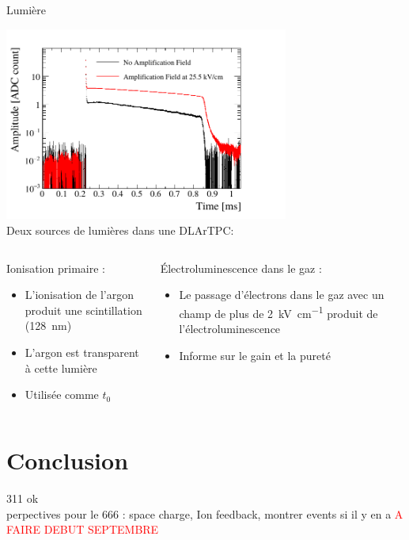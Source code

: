     \begin{frame}{Lumière}
        \begin{scriptsize}
            \centering \includegraphics[width=0.7\textwidth]{./pictures/scintillation.pdf}\\\vfill
            \centering Deux sources de lumières dans une DLArTPC:
            \begin{columns}
                \begin{column}{0.5\textwidth}
                    Ionisation primaire :
                    \begin{itemize}
                        \item L'ionisation de l'argon produit une scintillation (\SI{128}{\nano\meter})
                        \item L'argon est transparent à cette lumière
                        \item Utilisée comme $t_0$
                    \end{itemize}
                \end{column}
                \begin{column}{0.5\textwidth}
                    Électroluminescence dans le gaz :
                    \begin{itemize}
                        \item Le passage d'électrons dans le gaz avec un champ de plus de \SI{2}{\kilo\volt\per\centi\meter} produit de l'électroluminescence
                        \item Informe sur le gain et la pureté
                    \end{itemize}
                \end{column}
            \end{columns}
        \end{scriptsize}
    \end{frame}

  \section{Conclusion}

    \begin{specialframe}
        \vspace{2cm}\hspace*{-1.8cm}\parbox[t]{\textwidth}{
            311 ok \\
            perpectives pour le 666 : space charge, Ion feedback, montrer events si il y en a
            \textcolor{red}{A FAIRE DEBUT SEPTEMBRE}
        }
    \end{specialframe}
    

